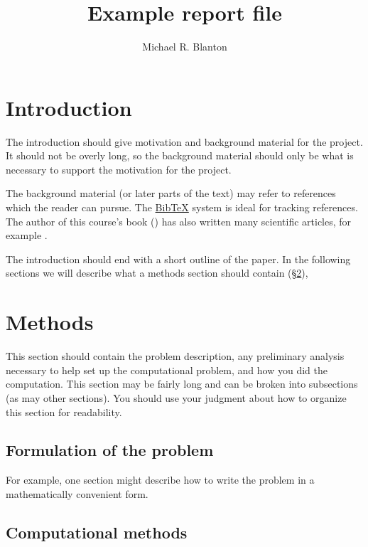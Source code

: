 \documentclass[11pt]{article}
\title{Example report file}
\author{Michael R. Blanton}
\begin{document}
\maketitle


\section{Introduction}
\label{sec:intro}

The introduction should give motivation and background material for
the project. It should not be overly long, so the background material
should only be what is necessary to support the motivation for the
project.

The background material (or later parts of the text) may refer to
references which the reader can pursue. The
\href{http://www.bibtex.org}{BibTeX} system is ideal for tracking
references. The author of this course's book (\citealt{newman2012a})
has also written many scientific articles, for example
\citet{newman2002a}.

The introduction should end with a short outline of the paper. In the
following sections we will describe what a methods section should
contain (\S\ref{sec:methods}), 

\section{Methods}
\label{sec:methods}

This section should contain the problem description, any preliminary
analysis necessary to help set up the computational problem, and how
you did the computation. This section may be fairly long and can be
broken into subsections (as may other sections). You should use your
judgment about how to organize this section for readability.

\subsection{Formulation of the problem}
\label{sec:formulation}

For example, one section might describe how to write the problem in a
mathematically convenient form.

\subsection{Computational methods}
\label{sec:computational}
\end{document}
